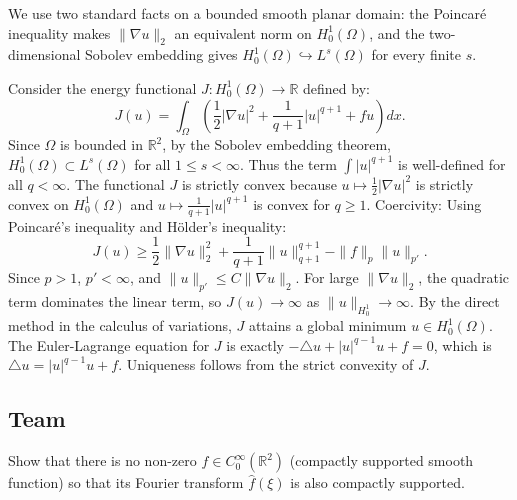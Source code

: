 \begin{solution}
We use two standard facts on a bounded smooth planar domain: the Poincar\'e inequality makes $\|\nabla u\|_2$ an equivalent norm on $H_0^1(\Omega)$, and the two-dimensional Sobolev embedding gives $H_0^1(\Omega)\hookrightarrow L^s(\Omega)$ for every finite $s$.

Consider the energy functional $J: H_0^1(\Omega) \to \mathbb{R}$ defined by:
\[
J(u) = \int_\Omega \left( \frac{1}{2}|\nabla u|^2 + \frac{1}{q+1}|u|^{q+1} + fu \right) dx.
\]
Since $\Omega$ is bounded in $\mathbb{R}^2$, by the Sobolev embedding theorem, $H_0^1(\Omega) \subset L^s(\Omega)$ for all $1 \leq s < \infty$. Thus the term $\int |u|^{q+1}$ is well-defined for all $q < \infty$.
The functional $J$ is strictly convex because $u \mapsto \frac{1}{2}|\nabla u|^2$ is strictly convex on $H_0^1(\Omega)$ and $u \mapsto \frac{1}{q+1}|u|^{q+1}$ is convex for $q \geq 1$.
Coercivity: Using Poincaré's inequality and Hölder's inequality:
\[
J(u) \geq \frac{1}{2}\|\nabla u\|_2^2 + \frac{1}{q+1}\|u\|_{q+1}^{q+1} - \|f\|_{p} \|u\|_{p'}.
\]
Since $p > 1$, $p' < \infty$, and $\|u\|_{p'} \leq C \|\nabla u\|_2$. For large $\|\nabla u\|_2$, the quadratic term dominates the linear term, so $J(u) \to \infty$ as $\|u\|_{H_0^1} \to \infty$.
By the direct method in the calculus of variations, $J$ attains a global minimum $u \in H_0^1(\Omega)$. The Euler-Lagrange equation for $J$ is exactly $-\triangle u + |u|^{q-1}u + f = 0$, which is $\triangle u = |u|^{q-1}u + f$. Uniqueness follows from the strict convexity of $J$.
\end{solution}

\subsection{Team}

\begin{exercise}
\label{analysis:2019:6}
Show that there is no non-zero $f\in C_0^{\infty}(\mathbb{R}^2)$ (compactly supported smooth function) so that its Fourier transform $\widehat{f}(\xi)$ is also compactly supported.
\end{exercise}

